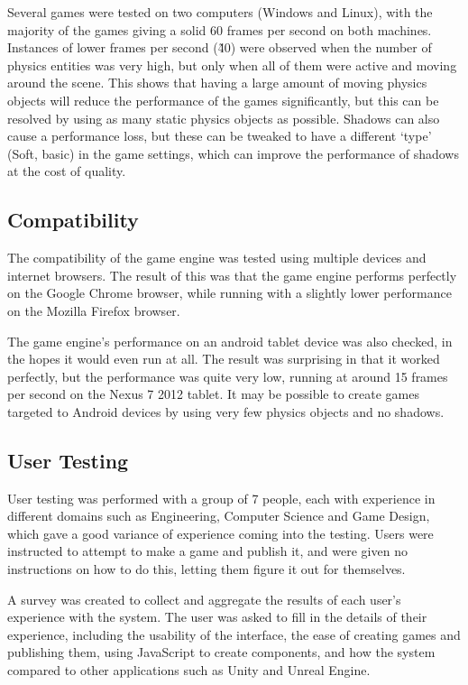 	Several games were tested on two computers (Windows and Linux), with the majority of the games giving a solid 60 frames per second on both machines. Instances of lower frames per second (\~40) were observed when the number of physics entities was very high, but only when all of them were active and moving around the scene. This shows that having a large amount of moving physics objects will reduce the performance of the games significantly, but this can be resolved by using as many static physics objects as possible. Shadows can also cause a performance loss, but these can be tweaked to have a different `type' (Soft, basic) in the game settings, which can improve the performance of shadows at the cost of quality.

	\subsection{Compatibility}
	The compatibility of the game engine was tested using multiple devices and internet browsers. The result of this was that the game engine performs perfectly on the Google Chrome browser, while running with a slightly lower performance on the Mozilla Firefox browser.

	The game engine's performance on an android tablet device was also checked, in the hopes it would even run at all. The result was surprising in that it worked perfectly, but the performance was quite very low, running at around 15 frames per second on the Nexus 7 2012 tablet. It may be possible to create games targeted to Android devices by using very few physics objects and no shadows.

	\subsection{User Testing}
	User testing was performed with a group of 7 people, each with experience in different domains such as Engineering, Computer Science and Game Design, which gave a good variance of experience coming into the testing. Users were instructed to attempt to make a game and publish it, and were given no instructions on how to do this, letting them figure it out for themselves.

	A survey was created to collect and aggregate the results of each user's experience with the system. The user was asked to fill in the details of their experience, including the usability of the interface, the ease of creating games and publishing them, using JavaScript to create components, and how the system compared to other applications such as Unity and Unreal Engine.

